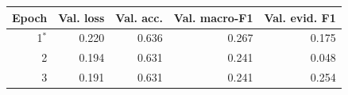 \begin{tabular}{rrrrr}\toprule
Epoch & Val. loss & Val. acc. & Val. macro-F1 & Val. evid. F1 \\\midrule
1$^*$ & 0.220 & 0.636 & 0.267 & 0.175 \\
2 & 0.194 & 0.631 & 0.241 & 0.048 \\
3 & 0.191 & 0.631 & 0.241 & 0.254 \\
\bottomrule\end{tabular}
